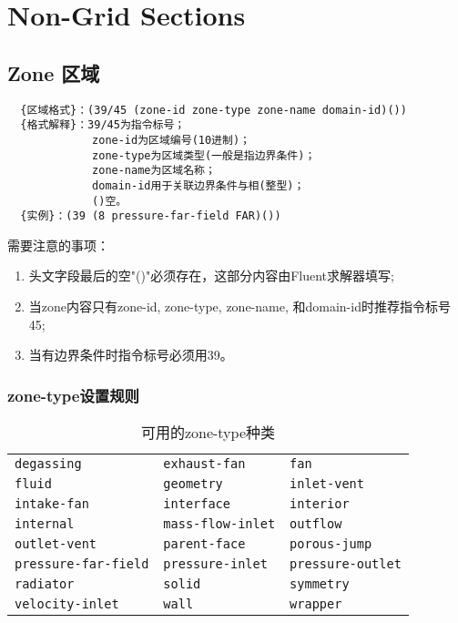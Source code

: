 \documentclass[lang=cn,11pt,a4paper]{elegantpaper} %
\begin{document}
\section{Non-Grid Sections}\label{NonGridSections}

\subsection{Zone 区域}\label{Zone}
\begin{lstlisting}
  {区域格式}：(39/45 (zone-id zone-type zone-name domain-id)())
  {格式解释}：39/45为指令标号；
             zone-id为区域编号(10进制)；
             zone-type为区域类型(一般是指边界条件)；
             zone-name为区域名称；
             domain-id用于关联边界条件与相(整型)；
             ()空。
  {实例}：(39 (8 pressure-far-field FAR)())
\end{lstlisting}

需要注意的事项：
\begin{enumerate}
  \item 头文字段最后的空"()"必须存在，这部分内容由Fluent求解器填写;
  \item 当zone内容只有zone-id, zone-type, zone-name, 和domain-id时推荐指令标号45;
  \item 当有边界条件时指令标号必须用39。
\end{enumerate}

\subsubsection{zone-type设置规则}\label{zone-type}
\begin{table}[!htb]
  \centering
  \caption{可用的zone-type种类}
  \begin{tabular}{*{3}{l}}
   \hline
   \texttt{degassing}       & \texttt{exhaust-fan}   & \texttt{fan} \\
   \texttt{fluid}           & \texttt{geometry}      & \texttt{inlet-vent} \\
   \texttt{intake-fan}      & \texttt{interface}     & \texttt{interior} \\
   \texttt{internal}        & \texttt{mass-flow-inlet}          & \texttt{outflow} \\
   \texttt{outlet-vent}     & \texttt{parent-face}   & \texttt{porous-jump} \\
   \texttt{pressure-far-field}         & \texttt{pressure-inlet}     & \texttt{pressure-outlet} \\
   \texttt{radiator}        & \texttt{solid}         & \texttt{symmetry} \\
   \texttt{velocity-inlet}  & \texttt{wall}          & \texttt{wrapper} \\
   \hline
  \end{tabular}
\end{table}
\end{document}
